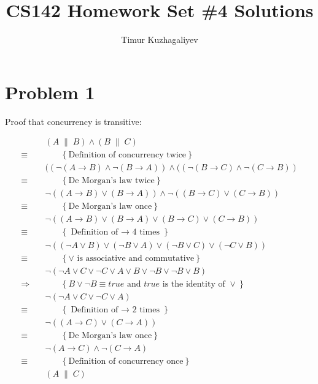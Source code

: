 \documentclass[10pt,letter]{article}
\begin{document}
\title{CS142 Homework Set \#4 Solutions}

\author{Timur Kuzhagaliyev}

 
\maketitle 

\section*{Problem 1}

Proof that concurrency is transitive:

\begin{align*}
& ( A\; \lVert\; B ) \land ( B\; \lVert\; C )
\\ \equiv \quad & \qquad \{\ \textrm{Definition of concurrency twice}\ \} \\
& ((\neg (A \rightarrow B) \land \neg (B \rightarrow A)) \land ((\neg (B \rightarrow C) \land \neg (C \rightarrow B))
\\ \equiv \quad & \qquad \{\ \textrm{De Morgan's law twice}\ \} \\
& \neg( (A \rightarrow B) \lor (B \rightarrow A)) \land \neg( (B \rightarrow C) \lor (C \rightarrow B))
\\ \equiv \quad & \qquad \{\ \textrm{De Morgan's law once}\ \} \\
& \neg ( (A \rightarrow B) \lor (B \rightarrow A) \lor (B \rightarrow C) \lor (C \rightarrow B) )
\\ \equiv \quad & \qquad \{\ \textrm{Definition of $\rightarrow$ 4 times}\ \} \\
& \neg ( (\neg A \lor B) \lor (\neg B \lor A) \lor (\neg B \lor C) \lor (\neg C \lor B) )
\\ \equiv \quad & \qquad \{\ \textrm{$\lor$ is associative and commutative}\ \} \\
& \neg ( \neg A \lor C \lor \neg C \lor A \lor B \lor \neg B \lor \neg B \lor B )
\\ \Rightarrow \quad & \qquad \{\ \textrm{$B \lor \neg B \equiv true$ and $true$ is the identity of $\lor$}\ \} \\
& \neg (\neg A \lor C \lor \neg C \lor A )
\\ \equiv \quad & \qquad \{\ \textrm{Definition of $\rightarrow$ 2 times}\ \} \\
& \neg (( A \rightarrow C ) \lor ( C \rightarrow A ))
\\ \equiv \quad & \qquad \{\ \textrm{De Morgan's law once}\ \} \\
& \neg ( A \rightarrow C ) \land \neg ( C \rightarrow A )
\\ \equiv \quad & \qquad \{\ \textrm{Definition of concurrency once}\ \} \\
& ( A\; \lVert\; C )
\end{align*}
\end{document}
